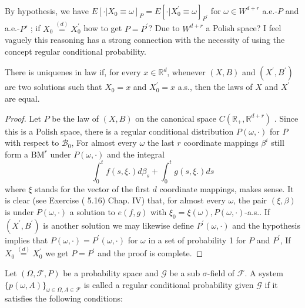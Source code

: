 \begin{itemize}
\\
By hypothesis, we have $ E\left[ \cdot | X_0 \equiv \omega\right]_P = E\left[ \cdot | X_0^\prime \equiv \omega\right]_{P^{\prime}} $ for $\omega \in W^{d+r}$ a.e.-$ P $ and a.e.-$ P\prime $ ; if $X_{0} \stackrel{(d)}{=} X_{0}^{\prime}$ how to get $P=P^{\prime}$? Due to $ W^{d+r} $ a Polish space? I feel vaguely this reasoning has a strong connection with the necessity of using the concept regular conditional probability.
\begin{proposition}[1.4 on page 367]
		There is uniquenes in law if, for every $x \in \mathbb{R}^{d}$, whenever $(X, B)$ and $\left(X^{\prime}, B^{\prime}\right)$ are two solutions such that $X_{0}=x$ and $X_{0}^{\prime}=x$ a.s., then the laws of $X$ and $X^{\prime}$ are equal.
	\end{proposition}
\begin{proof}
	Let $P$ be the law of $(X, B)$ on the canonical space $C\left(\mathbb{R}_{+}, \mathbb{R}^{d+r}\right)$ . Since this is a Polish space, there is a regular conditional distribution $P(\omega, \cdot)$ for $P$ with respect to $ \mathscr{B}_{0}$,  For almost every $\omega$ the last $r$ coordinate mappings $\beta^{i}$ still form a $\mathrm{BM}^{r}$ under $P(\omega, \cdot)$ and the integral \[ \int_{0}^{t} f(s, \xi .) d \beta_{s}+\int_{0}^{t} g(s, \xi .) d s \]where $\xi$ stands for the vector of the first $d$ coordinate mappings, makes sense. It is clear (see Exercise ( 5.16) Chap. IV\cite{revuz2013continuous}) that, for almost every $\omega$, the pair $(\xi, \beta)$ is under $P(\omega, \cdot)$ a solution to $e(f, g)$ with $\xi_{0}=\xi(\omega), P(\omega, \cdot)$-a.s.. If $\left(X^{\prime}, B^{\prime}\right)$ is another solution we may likewise define $P^{\prime}(\omega, \cdot)$ and the hypothesis implies that $P(\omega, \cdot)=P^{\prime}(\omega, \cdot)$ for $\omega$ in a set of probability 1 for $P$ and $P^{\prime}$,  If $X_{0} \stackrel{(d)}{=} X_{0}^{\prime}$ we get $P=P^{\prime}$ and the proof is complete.
\end{proof}
\begin{definition}
Let $ (\Omega,\mathscr{F},P) $ be a probability space and $  \mathscr { G } $  be a 
sub $\sigma$-field of $\mathscr{F}$. A system $\{p(\omega, A)\}_{\omega \in \Omega, A \in \mathscr{F}}$ is called a regular conditional probability given $\mathscr{G}$ if it satisfies the following conditions:\\

\end{definition}
\end{itemize}
